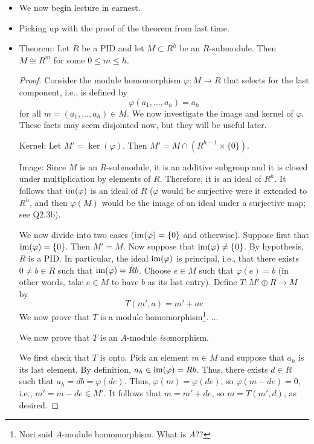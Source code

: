 \documentclass[../notes.tex]{subfiles}
\begin{document}
\begin{itemize}
\begin{itemize}
    \end{itemize}
    \item We now begin lecture in earnest.
    \item Picking up with the proof of the theorem from last time.
    \item Theorem: Let $R$ be a PID and let $M\subset R^h$ be an $R$-submodule. Then $M\cong R^m$ for some $0\leq m\leq h$.
    \begin{proof}
        Consider the module homomorphism $\varphi:M\to R$ that selects for the last component, i.e., is defined by
        \begin{equation*}
            \varphi(a_1,\dots,a_h) = a_h
        \end{equation*}
        for all $m=(a_1,\dots,a_h)\in M$. We now investigate the image and kernel of $\varphi$. These facts may seem disjointed now, but they will be useful later.\par
        Kernel: Let $M'=\ker(\varphi)$. Then $M'=M\cap(R^{h-1}\times\{0\})$.\par
        Image: Since $M$ is an $R$-submodule, it is an additive subgroup and it is closed under multiplication by elements of $R$. Therefore, it is an ideal of $R^h$. It follows that $\operatorname{im}(\varphi)$ is an ideal of $R$ ($\varphi$ would be surjective were it extended to $R^h$, and then $\varphi(M)$ would be the image of an ideal under a surjective map; see Q2.3b).\par
        We now divide into two cases ($\operatorname{im}(\varphi)=\{0\}$ and otherwise). Suppose first that $\operatorname{im}(\varphi)=\{0\}$. Then $M'=M$. Now suppose that $\operatorname{im}(\varphi)\neq\{0\}$. By hypothesis, $R$ is a PID. In particular, the ideal $\operatorname{im}(\varphi)$ is principal, i.e., that there exists $0\neq b\in R$ such that $\operatorname{im}(\varphi)=Rb$. Choose $e\in M$ such that $\varphi(e)=b$ (in other words, take $e\in M$ to have $b$ as its last entry). Define $T:M'\oplus R\to M$ by
        \begin{equation*}
            T(m',a) = m'+ae
        \end{equation*}
        We now prove that $T$ is a module homomorphism\footnote{Nori said $A$-module homomorphism. What is $A$??}. ...\par
        We now prove that $T$ is an $A$-module \emph{iso}morphism.\par
        We first check that $T$ is onto. Pick an element $m\in M$ and suppose that $a_h$ is its last element. By definition, $a_h\in\operatorname{im}(\varphi)=Rb$. Thus, there exists $d\in R$ such that $a_h=db=\varphi(de)$. Thus, $\varphi(m)=\varphi(de)$, so $\varphi(m-de)=0$, i.e., $m'=m-de\in M'$. It follows that $m=m'+de$, so $m=T(m',d)$, as desired.\par

\end{proof}
\end{itemize}
\end{document}
